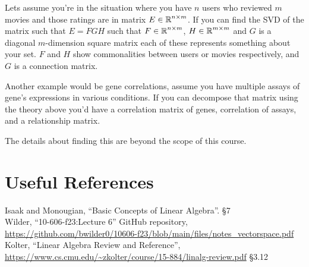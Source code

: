  Lets assume you're in the situation where you have $n$ users who reviewed $m$ movies and those ratings are in matrix $E\in\operatorname{\mathbb{R}}^{n\times m}$. 
 If you can find the SVD of the matrix such that $E=FGH$ such that $F\in\operatorname{\mathbb{R}}^{n\times m}$, $H\in\operatorname{\mathbb{R}}^{m\times m}$ and $G$ is a diagonal $m$-dimension square matrix each of these represents something about your set. 
 $F$ and $H$ show commonalities between users or movies respectively, 
 and $G$ is a connection matrix. 
 
 Another example would be gene correlations, assume you have multiple assays of gene's expressions in various conditions. 
 If you can decompose that matrix using the theory above you'd have a correlation matrix of genes, correlation of assays, and a relationship matrix. 
 
 
 The details about finding this are beyond the scope of this course. 


\section*{Useful References}
Isaak and Monougian, ``Basic Concepts of Linear Algebra''. \S 7\\
Wilder, ``10-606-f23:Lecture 6'' GitHub repository, \url{https://github.com/bwilder0/10606-f23/blob/main/files/notes_vectorspace.pdf}\\
Kolter, ``Linear Algebra Review and Reference'', \url{https://www.cs.cmu.edu/~zkolter/course/15-884/linalg-review.pdf} \S 3.12

